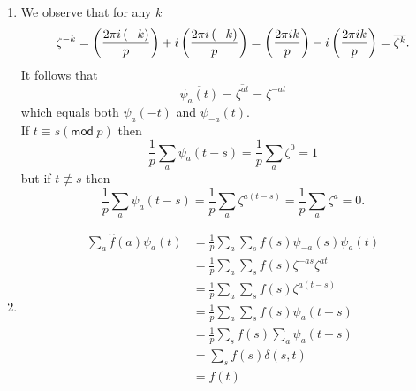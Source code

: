 \documentclass[12pt]{article}
\renewcommand{\pmod}[1]{\left(\mathsf{mod}\;#1\right)}
\let\sin\relax\DeclareMathOperator{\sin}{\mathsf{sin}}
\let\cos\relax\DeclareMathOperator{\cos}{\mathsf{cos}}
\begin{document}
\begin{enumerate}
\item %
We observe that for any $k$
\[\zeta^{-k}=\cos\left(\frac{2\pi i\left(-k\right)}{p}\right)
+i\sin\left(\frac{2\pi i\left(-k\right)}{p}\right)
=\cos\left(\frac{2\pi ik}{p}\right)-i\sin\left(\frac{2\pi ik}{p}\right)
=\overline{\zeta^k}.\]
It follows that
\[\overline{\psi_a\left(t\right)}
=\overline{\zeta^{at}}=\zeta^{-at}\]
which equals both $\psi_a\left(-t\right)$ and $\psi_{-a}\left(t\right)$.
\\
If $t\equiv s\pmod{p}$ then
\[\frac{1}{p}\sum_a\psi_a\left(t-s\right)
=\frac{1}{p}\sum_a\zeta^0=1\]
but if $t\not\equiv s$ then
\[\frac{1}{p}\sum_a\psi_a\left(t-s\right)
=\frac{1}{p}\sum_a\zeta^{a\left(t-s\right)}
=\frac{1}{p}\sum_a\zeta^a=0.\]

\item %
\begin{align*}
\sum_a\widehat{f}\left(a\right)\psi_a\left(t\right)
&=\frac{1}{p}\sum_a\sum_sf\left(s\right)
\psi_{-a}\left(s\right)\psi_a\left(t\right)\\
&=\frac{1}{p}\sum_a\sum_sf\left(s\right)
\zeta^{-as}\zeta^{at}\\
&=\frac{1}{p}\sum_a\sum_sf\left(s\right)\zeta^{a\left(t-s\right)}\\
&=\frac{1}{p}\sum_a\sum_sf\left(s\right)\psi_a\left(t-s\right)\\
&=\frac{1}{p}\sum_s f\left(s\right)\sum_a\psi_a\left(t-s\right)\\
&=\sum_s f\left(s\right)\delta\left(s,t\right)\\
&=f\left(t\right)
\end{align*}

\end{enumerate}
\end{document}
